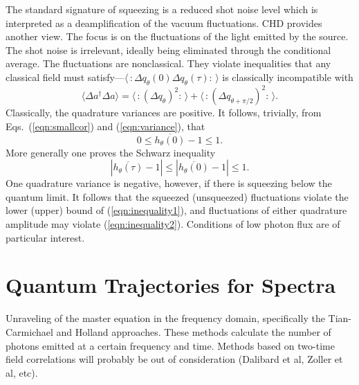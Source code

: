 \documentclass[twocolumn,aps,eqsecnum,showkeys,amsmath]{revtex4}
\begin{document}
The standard signature of squeezing is a reduced shot noise level which
is interpreted as a deamplification of the vacuum fluctuations. CHD
provides another view. The focus is on the fluctuations of the light
emitted by the source. The shot noise is irrelevant, ideally being
eliminated through the conditional average. The fluctuations are
nonclassical. They violate inequalities that any classical field must
satisfy---$\langle\,:\!\Delta q_\theta(0)\Delta q_\theta(\tau)\!:
\,\rangle$ is classically incompatible with
%
\begin{equation} 	\label{eqn:variance}
\langle\Delta a^\dagger\Delta a\rangle = 
	\langle\,:\!(\Delta q_\theta)^2\!:\,\rangle+\langle\,:\!(\Delta
	q_{\theta+\pi/2})^2\!:\,\rangle.
\end{equation}
Classically, the quadrature variances are positive. It follows,
trivially, from Eqs.\ (\ref{eqn:smallcor}) and (\ref{eqn:variance}), 
that
%
\begin{equation} 	\label{eqn:inequality1}
0\leq\overline{h_\theta(0)} -1 \leq 1.
\end{equation}
More generally one proves the Schwarz inequality
%
\begin{equation} \label{eqn:inequality2}
|\overline{h_\theta(\tau)}-1|\leq|\overline{h_\theta(0)}-1|\leq1.
\end{equation}
One quadrature variance is negative, however, if there is squeezing 
below the quantum limit. It follows that the squeezed (unsqueezed)
fluctuations violate the lower (upper) bound of (\ref{eqn:inequality1}),
and fluctuations of either quadrature amplitude may violate
(\ref{eqn:inequality2}). Conditions of low photon flux are of 
particular interest. 

\section{Quantum Trajectories for Spectra}
Unraveling of the master equation in the frequency domain, specifically 
the Tian-Carmichael \cite{TiCa92} and Holland \cite{Holland98} 
approaches. These methods calculate the number of photons emitted 
at a certain frequency and time. Methods based on two-time field 
correlations will probably be out of consideration (Dalibard et al, 
Zoller et al, etc). 
\end{document}

